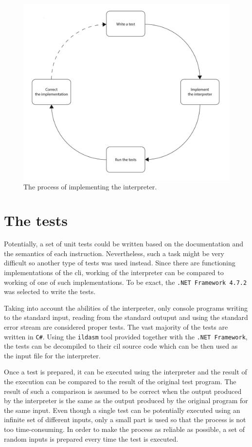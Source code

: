 \documentclass[declaration,shortabstract,english,mgr]{iithesis}
\begin{document}
\begin{figure}
	\includegraphics[width=1\textwidth]{process.jpg}
    \centering
    \caption{The process of implementing the interpreter.}
    \label{fig:process}
\end{figure}

\section{The tests}

Potentially, a set of unit tests could be written based on the documentation and the semantics of each instruction. Nevertheless, such a task might be very difficult so another type of tests was used instead. Since there are functioning implementations of the \acrshort{cli}, working of the interpreter can be compared to working of one of such implementations. To be exact, the \texttt{.NET Framework 4.7.2} was selected to write the tests.

Taking into account the abilities of the interpreter, only console programs writing to the standard input, reading from the standard outuput and using the standard error stream are considered proper tests. The vast majority of the tests are written in \texttt{C\#}. Using the \texttt{ildasm} tool provided together with the \texttt{.NET Framework}, the tests can be decompiled to their \acrshort{cil} source code which can be then used as the input file for the interpreter. 

Once a test is prepared, it can be executed using the interpreter and the result of the execution can be compared to the result of the original test program. The result of such a comparison is assumed to be correct when the output produced by the interpreter is the same as the output produced by the original program for the same input. Even though a single test can be potentially executed using an infinite set of different inputs, only a small part is used so that the process is not too time-consuming. In order to make the process as reliable as possible, a set of random inputs is prepared every time the test is executed.
\end{document}

